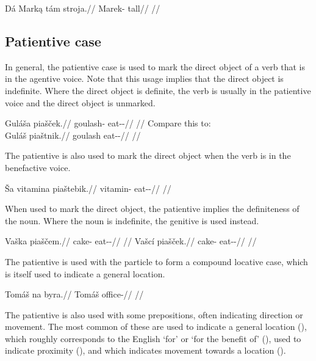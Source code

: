 \pex
\begingl
\gla Dá Mark\k{a} tám stroja.//
\glb {} Marek-\Agt{} \Comp{} tall//
\glft {}//
\endgl
\xe

\subsection{Patientive case}

In general, the patientive case is used to mark the direct object of a verb that is in the agentive voice. Note that this usage implies that the direct object is indefinite. Where the direct object is definite, the verb is usually in the patientive voice and the direct object is unmarked.

\pex
\a \begingl
\gla Guláša piašček.//
\glb goulash-\Acc{} eat-\Av{}-\Pf{}//
\glft {}//
\endgl
\a Compare this to:\\
\begingl
\gla Guláš piaštnik.//
\glb goulash eat-\Pv{}-\Pf{}//
\glft {}//
\endgl
\xe

The patientive is also used to mark the direct object when the verb is in the benefactive voice.

\pex
\begingl
\gla Ša vitamina piaštebik.//
\glb {} vitamin-\Acc{} eat-\Ben{}-\Pf{}//
\glft {}//
\endgl
\xe


When used to mark the direct object, the patientive implies the definiteness of the noun. Where the noun is indefinite, the genitive is used instead.

\pex
\a\begingl
\gla Vaška piaščem.//
\glb cake-\Acc{} eat-\Av{}-\Pf{}//
\glft {}//
\endgl
\a\begingl
\gla Vašcí piašček.//
\glb cake-\Gen{} eat-\Av{}-\Pf{}//
\glft {}//
\endgl
\xe

The patientive is used with the particle  to form a compound locative case, which is itself used to indicate a general location.

\pex
\begingl
\gla Tomáš na byra.//
\glb Tomáš \Loc{} office-\Acc{}//
\glft {}//
\endgl
\xe

The patientive is also used with some prepositions, often indicating direction or movement. The most common of these are  used to indicate a general location (),  which roughly corresponds to the English `for' or `for the benefit of' (),  used to indicate proximity (), and  which indicates movement towards a location ().

